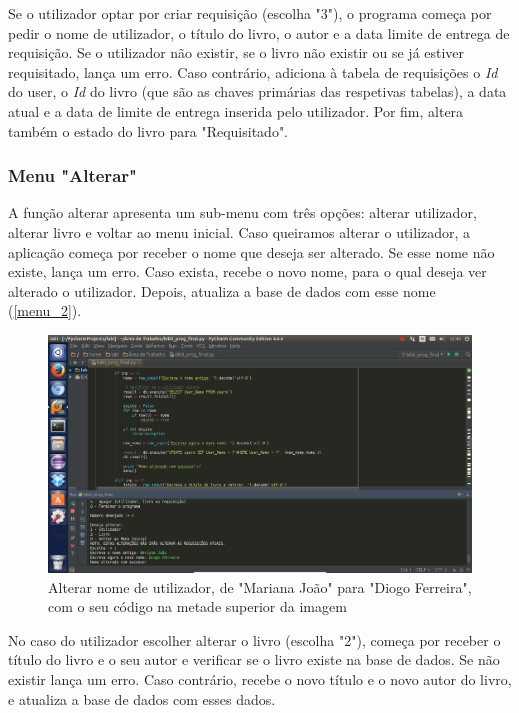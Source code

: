 \documentclass[11pt,openany,twoside]{report}
\begin{document}
Se o utilizador optar por criar requisição (escolha "3"), o programa começa por pedir o nome de utilizador, o título do livro, o autor e a data limite de entrega de requisição. Se o utilizador não existir, se o livro não existir ou se já estiver requisitado, lança um erro. Caso contrário, adiciona à tabela de requisições o \textit{Id} do user, o \textit{Id} do livro (que são as chaves primárias das respetivas tabelas), a data atual e a data de limite de entrega inserida pelo utilizador. Por fim, altera também o estado do livro para "Requisitado".

\subsubsection{Menu "Alterar"}

A função alterar apresenta um sub-menu com três opções: alterar utilizador, alterar livro e voltar ao menu inicial. Caso queiramos alterar o utilizador, a aplicação começa por receber o nome que deseja ser alterado. Se esse nome não existe, lança um erro. Caso exista, recebe o novo nome, para o qual deseja ver alterado o utilizador. Depois, atualiza a base de dados com esse nome (\autoref{menu_2}).

\begin{figure}
 \center
 \includegraphics[scale=.35]{menu_2.png}
 \caption{Alterar nome de utilizador, de "Mariana João" para "Diogo Ferreira", com o seu código na metade superior da imagem}
 \label{menu_2}
\end{figure}


No caso do utilizador escolher alterar o livro (escolha "2"), começa por receber o título do livro e o seu autor e verificar se o livro existe na base de dados. Se não existir lança um erro. Caso contrário, recebe o novo título e o novo autor do livro, e atualiza a base de dados com esses dados.
\end{document}
